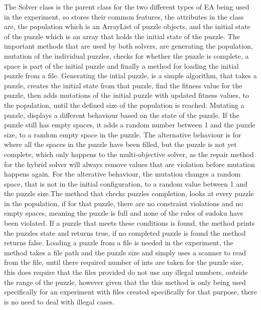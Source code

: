 \documentclass[a4paper,11pt]{article}
\begin{document}
The Solver class is the parent class for the two different types of EA being used in the experiment, so stores their common features, the attributes in the class are, the population which is an ArrayList of puzzle objects, and the initial state of the puzzle which is an array that holds the initial state of the puzzle. The important methods that are used by both solvers, are generating the population, mutation of the individual puzzles, checks for whether the puzzle is complete, a space is part of the initial puzzle and finally a method for loading the initial puzzle from a file.  \newline\newline Generating the intial puzzle, is a simple algorithm, that takes a puzzle, creates the initial state from that puzzle, find the fitness value for the puzzle, then adds mutations of the initial puzzle with updated fitness values, to the population, until the defined size of the population is reached. \newline\newline Mutating a puzzle, displays a different behaviour based on the state of the puzzle. If the puzzle still has empty spaces, it adds a random number between 1 and the puzzle size, to a random empty space in the puzzle. The alternative behaviour is for where all the spaces in the puzzle have been filled, but the puzzle is not yet complete, which only happens to the multi-objective solver, as the repair method for the hybrid solver will always remove values that are violation before mutation happens again. For the alterative behaviour, the mutation changes a random space, that is not in the initial configuration, to a random value between 1 and the puzzle size.\newline\newline The method that checks puzzles completion, looks at every puzzle in the population, if for that puzzle, there are no constraint violations and no empty spaces, meaning the puzzle is full and none of the rules of sudoku have been violated. If a puzzle that meets these conditions is found, the method prints the puzzles state and returns true, if no completed puzzle is found the method returns false. \newline\newline Loading a puzzle from a file is needed in the experiment, the method takes a file path and the puzzle size and simply uses a scanner to read from the file, until there required number of ints are taken for the puzzle size, this does require that the files provided do not use any illegal numbers, outside the range of the puzzle, however given that the this method is only being used specifically for an experiment with files created specifically for that purpose, there is no need to deal with illegal cases. 
\end{document}
